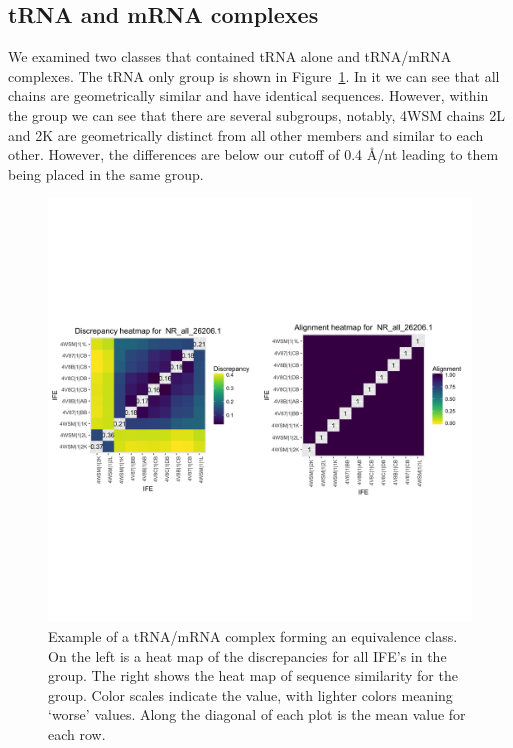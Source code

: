 \subsection{tRNA and mRNA complexes}

We examined two classes that contained tRNA alone and tRNA/mRNA complexes. The
tRNA only group is shown in Figure~\ref{fig:trna-alone}. In it we can see that all
chains are geometrically similar and have identical sequences. However, within
the group we can see that there are several subgroups, notably, 4WSM chains 2L
and 2K are geometrically distinct from all other members and similar to each
other. However, the differences are below our cutoff of 0.4 {\AA}/nt leading to them
being placed in the same group.

\begin{figure}[h]
  \includegraphics[width=\textwidth]{chapter-3/figs/trna-alone}
  \caption{Example of a tRNA/mRNA complex forming an equivalence class. On the
    left is a heat map of the discrepancies for all IFE’s in the group. The
    right shows the heat map of sequence similarity for the group. Color scales
    indicate the value, with lighter colors meaning ‘worse’ values. Along the
  diagonal of each plot is the mean value for each row.}
  \label{fig:trna-alone}
\end{figure}


